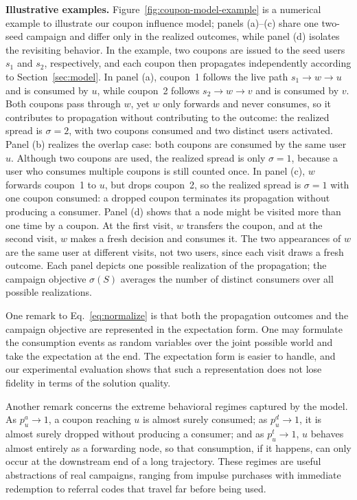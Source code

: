 \documentclass[sigconf]{acmart}
\begin{document}
\textcolor[rgb]{1.00,0.00,0.00}{
\textbf{Illustrative examples.}
Figure~\ref{fig:coupon-model-example} is a numerical example to
illustrate our coupon influence model; panels (a)--(c) share one
two-seed campaign and differ only in the realized outcomes, while
panel (d) isolates the revisiting behavior.
In the example, two coupons are issued to the seed users
$s_1$ and $s_2$, respectively, and each coupon then propagates
independently according to Section~\ref{sec:model}.
In panel (a), coupon~1 follows the live path $s_1\to w\to u$ and
is consumed by $u$, while coupon~2 follows $s_2\to w\to v$ and is
consumed by $v$.
Both coupons pass through $w$, yet $w$ only forwards and never
consumes, so it contributes to propagation without contributing to
the outcome: the realized spread is $\sigma=2$, with two coupons
consumed and two distinct users activated.
Panel (b) realizes the overlap case: both coupons are consumed by
the same user $u$.
Although two coupons are used, the realized spread is only
$\sigma=1$, because a user who consumes multiple coupons is still
counted once.
In panel (c), $w$ forwards coupon~1 to $u$,
but drops coupon~2, so the realized spread is $\sigma=1$ with one
coupon consumed: a dropped coupon terminates its propagation
without producing a consumer.
Panel (d) shows that a node might be visited more than one time by a coupon.
At the
first visit, $w$ transfers the coupon, and at the second visit,
$w$ makes a fresh decision and consumes it.
The two appearances of $w$ are the same user at different visits,
not two users, since each visit draws a fresh outcome.
Each panel depicts one possible realization of the propagation;
the campaign objective $\sigma(S)$ averages the number of distinct
consumers over all possible realizations.
}

One remark to Eq.~\eqref{eq:normalize} is that both the propagation
outcomes and the campaign objective are represented in the expectation
form.
One may formulate the consumption events as random variables over the
joint possible world and take the expectation at the end.
The expectation form is easier to handle, and our experimental
evaluation shows that such a representation does not lose fidelity in
terms of the solution quality.

Another remark concerns the extreme behavioral regimes captured by
the model.
As $p_u^a\to 1$, a coupon reaching $u$ is almost surely consumed; as
$p_u^d\to 1$, it is almost surely dropped without producing a
consumer; and as $p_u^t\to 1$, $u$ behaves almost entirely as a
forwarding node, so that consumption, if it happens, can only occur
at the downstream end of a long trajectory.
These regimes are useful abstractions of real campaigns, ranging from
impulse purchases with immediate redemption to referral codes that
travel far before being used.
\end{document}
